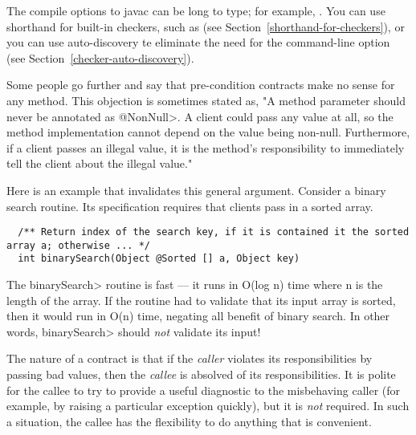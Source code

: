 \begin{sloppypar}
The compile options to javac can be long to type; for example,
.
You can use shorthand for built-in checkers, such as  (see Section~\ref{shorthand-for-checkers}), or you can use
auto-discovery te eliminate the need for the  command-line
option (see Section~\ref{checker-auto-discovery}).
\end{sloppypar}



Some people go further and say that pre-condition contracts make no sense
for any method.  This objection is sometimes stated as, "A method parameter
should never be annotated as \<@NonNull>.  A client could pass any value at
all, so the method implementation cannot depend on the value being
non-null.  Furthermore, if a client passes an illegal value, it is the
method's responsibility to immediately tell the client about the illegal
value."

Here is an example that invalidates this general argument.  Consider a
binary search routine.  Its specification requires that clients pass in a
sorted array.

\begin{smaller}
\begin{Verbatim}
  /** Return index of the search key, if it is contained it the sorted array a; otherwise ... */
  int binarySearch(Object @Sorted [] a, Object key)
\end{Verbatim}
\end{smaller}

The \<binarySearch> routine is fast --- it runs in O(log n) time where n is
the length of the array.  If the routine had to validate that its input
array is sorted, then it would run in O(n) time, negating all benefit of
binary search.  In other words, \<binarySearch> should \emph{not} validate
its input!

The nature of a contract is that if the \emph{caller} violates its
responsibilities by passing bad values, then the \emph{callee} is absolved
of its responsibilities.  It is polite for the callee to try to provide a
useful diagnostic to the misbehaving caller (for example, by raising a
particular exception quickly), but it is \emph{not} required.  In such a
situation, the callee has the flexibility to do anything that is
convenient.

